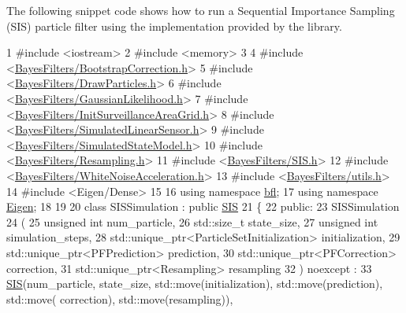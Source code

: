 The following snippet code shows how to run a Sequential Importance Sampling (S\+IS) particle filter using the implementation provided by the library.~\newline



\begin{DoxyCodeInclude}
1 \textcolor{preprocessor}{#include <iostream>}
2 \textcolor{preprocessor}{#include <memory>}
3 
4 \textcolor{preprocessor}{#include <\mbox{\hyperlink{BootstrapCorrection_8h}{BayesFilters/BootstrapCorrection.h}}>}
5 \textcolor{preprocessor}{#include <\mbox{\hyperlink{DrawParticles_8h}{BayesFilters/DrawParticles.h}}>}
6 \textcolor{preprocessor}{#include <\mbox{\hyperlink{GaussianLikelihood_8h}{BayesFilters/GaussianLikelihood.h}}>}
7 \textcolor{preprocessor}{#include <\mbox{\hyperlink{InitSurveillanceAreaGrid_8h}{BayesFilters/InitSurveillanceAreaGrid.h}}>}
8 \textcolor{preprocessor}{#include <\mbox{\hyperlink{SimulatedLinearSensor_8h}{BayesFilters/SimulatedLinearSensor.h}}>}
9 \textcolor{preprocessor}{#include <\mbox{\hyperlink{SimulatedStateModel_8h}{BayesFilters/SimulatedStateModel.h}}>}
10 \textcolor{preprocessor}{#include <\mbox{\hyperlink{Resampling_8h}{BayesFilters/Resampling.h}}>}
11 \textcolor{preprocessor}{#include <\mbox{\hyperlink{SIS_8h}{BayesFilters/SIS.h}}>}
12 \textcolor{preprocessor}{#include <\mbox{\hyperlink{WhiteNoiseAcceleration_8h}{BayesFilters/WhiteNoiseAcceleration.h}}>}
13 \textcolor{preprocessor}{#include <\mbox{\hyperlink{utils_8h}{BayesFilters/utils.h}}>}
14 \textcolor{preprocessor}{#include <Eigen/Dense>}
15 
16 \textcolor{keyword}{using namespace }\mbox{\hyperlink{namespacebfl}{bfl}};
17 \textcolor{keyword}{using namespace }\mbox{\hyperlink{namespaceEigen}{Eigen}};
18 
19 
20 \textcolor{keyword}{class }SISSimulation : \textcolor{keyword}{public} \mbox{\hyperlink{classbfl_1_1SIS}{SIS}}
21 \{
22 \textcolor{keyword}{public}:
23     SISSimulation
24     (
25         \textcolor{keywordtype}{unsigned} \textcolor{keywordtype}{int} num\_particle,
26         std::size\_t state\_size,
27         \textcolor{keywordtype}{unsigned} \textcolor{keywordtype}{int} simulation\_steps,
28         std::unique\_ptr<ParticleSetInitialization> initialization,
29         std::unique\_ptr<PFPrediction> prediction,
30         std::unique\_ptr<PFCorrection> correction,
31         std::unique\_ptr<Resampling> resampling
32     ) noexcept :
33         \mbox{\hyperlink{classbfl_1_1SIS}{SIS}}(num\_particle, state\_size, std::move(initialization), std::move(prediction), std::move(
      correction), std::move(resampling)),

\end{DoxyCodeInclude}
